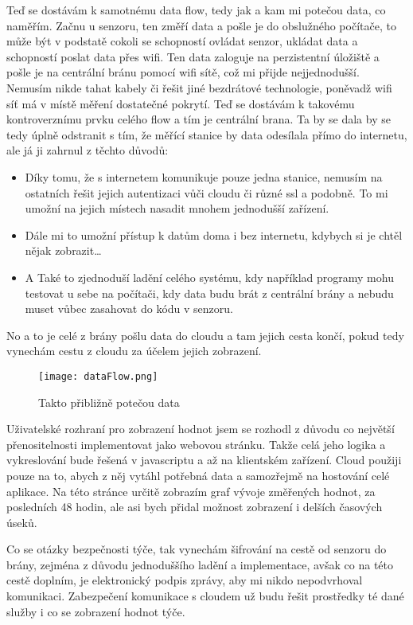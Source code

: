 Teď se dostávám k samotnému data flow, tedy jak a kam mi potečou data, co naměřím. Začnu u senzoru, ten změří data 
a pošle je do obslužného počítače, to může být v podstatě cokoli se schopností ovládat senzor, ukládat data a schopností 
poslat data přes wifi. Ten data zaloguje na perzistentní úložiště a pošle je na centrální bránu pomocí wifi sítě, což mi 
přijde nejjednodušší. Nemusím nikde tahat kabely či řešit jiné bezdrátové technologie, poněvadž wifi síť má v místě 
měření dostatečné pokrytí. Teď se dostávám k takovému kontroverznímu prvku celého flow a tím je centrální \gls{brana}. 
Ta by se dala by se tedy úplně odstranit s tím, že měřící stanice by data odesílala přímo do internetu, ale já ji 
zahrnul z těchto důvodů:
\begin{itemize}
	\item Díky tomu, že s internetem komunikuje pouze jedna stanice, nemusím na ostatních řešit jejich autentizaci vůči 
cloudu či různé \gls{ssl}  a podobně. To mi umožní na jejich místech nasadit mnohem 
jednodušší zařízení.
	\item Dále mi to umožní přístup k datům doma i bez internetu, kdybych si je chtěl nějak zobrazit\ldots
	\item A Také to zjednoduší ladění celého systému, kdy například programy mohu testovat u sebe na počítači, kdy data 
budu brát z centrální brány a nebudu muset vůbec zasahovat do kódu v senzoru.
\end{itemize}
No a to je celé z brány pošlu data do cloudu a tam jejich cesta končí, pokud tedy vynechám cestu z cloudu za účelem 
jejich zobrazení.
\begin{figure}[H]
		\centering
		\texttt{[image: dataFlow.png]}
		\caption{Takto přibližně potečou data}
\end{figure}

Uživatelské rozhraní pro zobrazení hodnot jsem se rozhodl z důvodu co největší přenositelnosti implementovat jako 
webovou stránku. Takže celá jeho logika a vykreslování bude řešená v javascriptu a až na klientském zařízení. Cloud 
použiji pouze na to, abych z něj vytáhl potřebná data a samozřejmě na hostování celé aplikace. Na této stránce určitě 
zobrazím graf vývoje změřených hodnot, za posledních 48 hodin, ale asi bych přidal možnost zobrazení i delších časových 
úseků.

Co se otázky bezpečnosti týče, tak vynechám šifrování na cestě od senzoru do brány, zejména z důvodu jednoduššího ladění 
a implementace, avšak co na této cestě doplním, je elektronický podpis zprávy, aby mi nikdo nepodvrhoval komunikaci. 
Zabezpečení komunikace s cloudem už budu řešit prostředky té dané služby i co se zobrazení hodnot týče.
